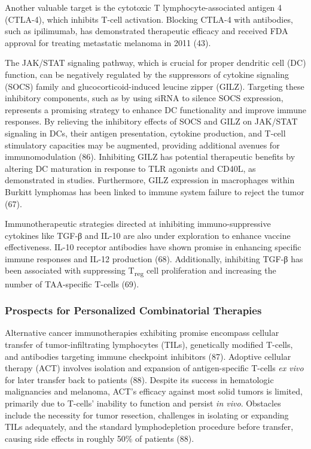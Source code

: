 \documentclass[
]{article}
\begin{document}
Another valuable target is the cytotoxic T lymphocyte-associated antigen
4 (CTLA-4), which inhibits T-cell activation. Blocking CTLA-4 with
antibodies, such as ipilimumab, has demonstrated therapeutic efficacy
and received FDA approval for treating metastatic melanoma in 2011 (43).

The JAK/STAT signaling pathway, which is crucial for proper dendritic
cell (DC) function, can be negatively regulated by the suppressors of
cytokine signaling (SOCS) family and glucocorticoid-induced leucine
zipper (GILZ). Targeting these inhibitory components, such as by using
siRNA to silence SOCS expression, represents a promising strategy to
enhance DC functionality and improve immune responses. By relieving the
inhibitory effects of SOCS and GILZ on JAK/STAT signaling in DCs, their
antigen presentation, cytokine production, and T-cell stimulatory
capacities may be augmented, providing additional avenues for
immunomodulation (86). Inhibiting GILZ has potential therapeutic
benefits by altering DC maturation in response to TLR agonists and
CD40L, as demonstrated in studies. Furthermore, GILZ expression in
macrophages within Burkitt lymphomas has been linked to immune system
failure to reject the tumor (67).

Immunotherapeutic strategies directed at inhibiting immuno-suppressive
cytokines like TGF-β and IL-10 are also under exploration to enhance
vaccine effectiveness. IL-10 receptor antibodies have shown promise in
enhancing specific immune responses and IL-12 production (68).
Additionally, inhibiting TGF-β has been associated with suppressing
T\textsubscript{reg} cell proliferation and increasing the number of
TAA-specific T-cells (69).

\subsubsection{Prospects for Personalized Combinatorial
Therapies}\label{prospects-for-personalized-combinatorial-therapies}

Alternative cancer immunotherapies exhibiting promise encompass cellular
transfer of tumor-infiltrating lymphocytes (TILs), genetically modified
T-cells, and antibodies targeting immune checkpoint inhibitors (87).
Adoptive cellular therapy (ACT) involves isolation and expansion of
antigen-specific T-cells \emph{ex vivo} for later transfer back to
patients (88). Despite its success in hematologic malignancies and
melanoma, ACT's efficacy against most solid tumors is limited, primarily
due to T-cells' inability to function and persist \emph{in vivo}.
Obstacles include the necessity for tumor resection, challenges in
isolating or expanding TILs adequately, and the standard lymphodepletion
procedure before transfer, causing side effects in roughly 50\% of
patients (88).
\end{document}
